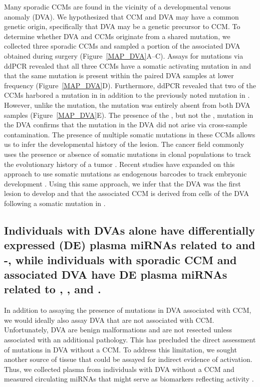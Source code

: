 Many sporadic CCMs are found in the vicinity of a developmental venous anomaly (DVA). We hypothesized that CCM and DVA may have a common genetic origin, specifically that DVA may be a genetic precursor to CCM. To determine whether DVA and CCMs originate from a shared mutation, we collected three sporadic CCMs and sampled a portion of the associated DVA obtained during surgery (Figure~\ref{MAP_DVA}A--C). Assays for mutations via ddPCR revealed that all three CCMs have a somatic activating mutation in  and that the same mutation is present within the paired DVA samples at lower frequency (Figure~\ref{MAP_DVA}D). Furthermore, ddPCR revealed that two of the CCMs harbored a mutation in  in addition to the previously noted mutation in . However, unlike the  mutation, the  mutation was entirely absent from both DVA samples (Figure~\ref{MAP_DVA}E). The presence of the , but not the , mutation in the DVA confirms that the  mutation in the DVA did not arise via cross-sample contamination. The presence of multiple somatic mutations in these CCMs allows us to infer the developmental history of the lesion. The cancer field commonly uses the presence or absence of somatic mutations in clonal populations to track the evolutionary history of a tumor \citep{jiao2014, loo2018}. Recent studies have expanded on this approach to use somatic mutations as endogenous barcodes to track embryonic development \citep{bizzotto2021}. Using this same approach, we infer that the DVA was the first lesion to develop and that the associated CCM is derived from cells of the DVA following a somatic mutation in . 

\subsection{Individuals with DVAs alone have differentially expressed (DE) plasma miRNAs related to  and -, while individuals with sporadic CCM and associated DVA have DE plasma miRNAs related to , , and . }

In addition to assaying the presence of  mutations in DVA associated with CCM, we would ideally also assay DVA that are not associated with CCM. Unfortunately, DVA are benign malformations and are not resected unless associated with an additional pathology. This has precluded the direct assessment of  mutations in DVA without a CCM.   To address this limitation, we sought another source of tissue that could be assayed for indirect evidence of  activation.  Thus, we collected plasma from individuals with DVA without a CCM and measured circulating miRNAs that might serve as biomarkers reflecting  activity \citep{mori2019}.

